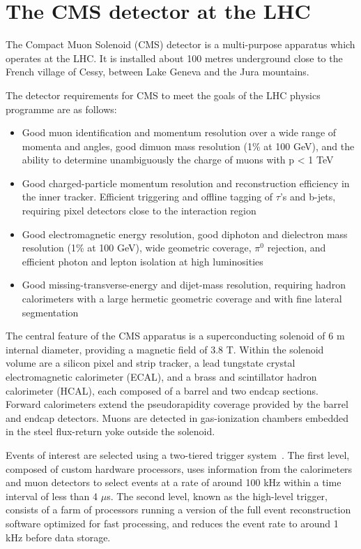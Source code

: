 \chapter{The CMS detector at the LHC}

The Compact Muon Solenoid (CMS) detector is a multi-purpose apparatus which operates at the LHC. 
It is installed about 100 metres underground close to the French village of Cessy, between
Lake Geneva and the Jura mountains.

The detector requirements for CMS to meet the goals of the LHC physics programme are as follows:
\begin{itemize}
\item Good muon identification and momentum resolution over a wide range of momenta and
angles, good dimuon mass resolution (1\% at 100 GeV), and the ability to determine unambiguously
the charge of muons with p < 1 TeV
\item Good charged-particle momentum resolution and reconstruction efficiency in the inner
tracker. Efficient triggering and offline tagging of $\tau$'s and b-jets, requiring pixel detectors
close to the interaction region
\item Good electromagnetic energy resolution, good diphoton and dielectron mass resolution (1\% at 100 GeV),
wide geometric coverage, ${\pi}^{0}$ rejection, and efficient photon and lepton
isolation at high luminosities
\item Good missing-transverse-energy and dijet-mass resolution, requiring hadron calorimeters
with a large hermetic geometric coverage and with fine lateral segmentation
\end{itemize}

The central feature of the CMS apparatus is a superconducting solenoid of 6 m internal diameter, providing a magnetic field of 3.8 T.
Within the solenoid volume are a silicon pixel and strip tracker, a lead tungstate crystal electromagnetic calorimeter (ECAL), and a brass and scintillator hadron calorimeter (HCAL), each composed of a barrel and two endcap sections. 
Forward calorimeters extend the pseudorapidity coverage provided by the barrel and endcap detectors. 
Muons are detected in gas-ionization chambers embedded in the steel flux-return yoke outside the solenoid.

Events of interest are selected using a two-tiered trigger system~\cite{Khachatryan:2016bia}.
The first level, composed of custom hardware processors, uses information from the calorimeters and muon detectors to select events at a rate of around 100 kHz within a time interval of less than 4 $\mu$s.
The second level, known as the high-level trigger, consists of a farm of processors running a version of the full event reconstruction software optimized for fast processing, and reduces the event rate to around 1 kHz before data storage.

